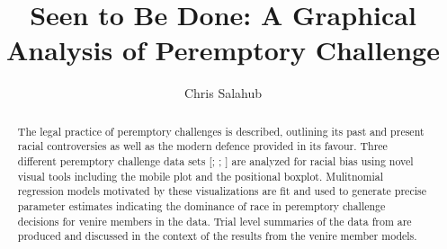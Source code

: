 \documentclass[12pt]{article}
\title{Seen to Be Done: A Graphical Analysis of Peremptory Challenge}
\author{Chris Salahub}
\begin{document}
\maketitle

\begin{abstract}
The legal practice of peremptory challenges is described, outlining its past and present racial controversies as well as the
modern defence provided in its favour. Three different peremptory challenge data sets
[\cite{JurySunshineProj}; \cite{StubbornLegacy};
\cite{PerempChalMurder}] are analyzed for racial bias using novel visual tools including
the mobile plot and the positional boxplot. Mulitnomial
regression models motivated by these visualizations are fit and used to generate precise parameter estimates indicating the
dominance of race in peremptory challenge decisions for venire members in the \cite{JurySunshineProj} data. Trial level
summaries of the data from \cite{JurySunshineProj} are produced and discussed in the context of the results from the venire
member models.
\end{abstract}
 





 




\end{document}
